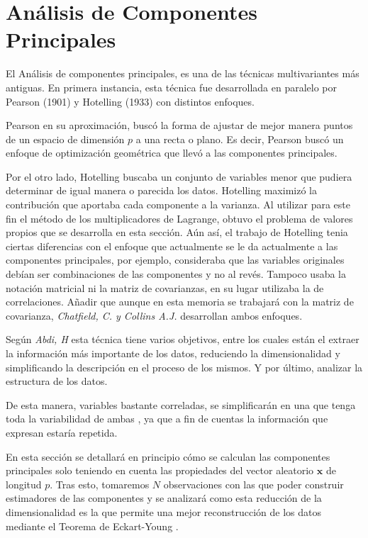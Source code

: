 \newpage
\section{Análisis de Componentes Principales}
\noindent El Análisis de componentes principales, es una de las técnicas multivariantes más antiguas. En primera instancia, esta técnica fue desarrollada en paralelo por Pearson (1901) y Hotelling (1933) \cite{Jollife 1986} con distintos enfoques. 

\noindent Pearson en su aproximación, buscó la forma de ajustar de mejor manera puntos de un espacio de dimensión $p$ a una recta o plano. Es decir, Pearson buscó un enfoque de optimización geométrica que llevó a las componentes principales.

\noindent Por el otro lado, Hotelling buscaba un conjunto de variables menor que pudiera determinar de igual manera o parecida los datos. Hotelling maximizó la contribución que aportaba cada componente a la varianza. Al utilizar para este fin el método de los multiplicadores de Lagrange, obtuvo el problema de valores propios que se desarrolla en esta sección. Aún así, el trabajo de Hotelling tenia ciertas diferencias con el enfoque que actualmente se le da actualmente a las componentes principales, por ejemplo, consideraba que las variables originales  debían ser combinaciones de las componentes y no al revés. Tampoco usaba la notación matricial ni la matriz de covarianzas, en su lugar utilizaba la de correlaciones. Añadir que aunque en esta memoria se trabajará con la matriz de covarianza, \emph{Chatfield, C. y Collins A.J.}\cite{Chatfield 1989} desarrollan ambos enfoques. 

\noindent Según \emph{Abdi, H} \cite{Abdi 2010} esta técnica tiene varios objetivos, entre los cuales están el extraer la información más importante de los datos, reduciendo la dimensionalidad y simplificando la descripción en el proceso de los mismos. Y por último, analizar la estructura de los datos. 


\noindent De esta manera, variables bastante correladas, se simplificarán en una que tenga toda la variabilidad de ambas \cite{Chatfield 1989}, \cite{Everitt 2011} ya que a fin de cuentas la información que expresan estaría repetida. 

\noindent En esta sección se detallará en principio cómo se calculan las componentes principales solo teniendo en cuenta las propiedades del vector aleatorio $\mathbf{x}$ de longitud $p$. Tras esto, tomaremos $N$ observaciones con las que poder construir estimadores de las componentes y se analizará como esta reducción de la dimensionalidad es la que permite una mejor reconstrucción de los datos mediante el Teorema de Eckart-Young \cite{Eckart 1936}. 

